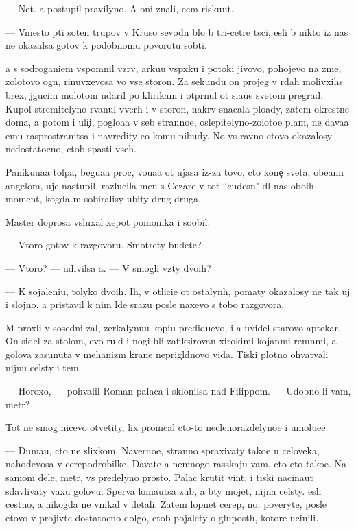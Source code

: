 \documentclass[10pt]{book}
\begin{document}
— Net. {\Y}a postupil pravilyno. A oni znali, cem risku{\y}ut.

— Vmesto p{\ia}ti soten trupov v Kruso sevodn{\ia} b{\yi}lo b{\yi} tri-cet{\yi}re t{\yi}s{\ia}ci, {\y}esli b{\yi} nikto iz nas ne okazalsa gotov k podobnomu povorotu sob{\yi}ti{\y}.

{\Y}a s sodrogani{\y}em vspomnil vzr{\yi}v, {\y}arku{\y}u vsp{\yi}xku i potoki jivovo, pohojevo na zme{\y}, zolotovo ogn{\ia}, rinuvxevosa vo vse storon{\yi}. Za sekundu on projeg v r{\ia}dah molivxihs{\ia} brex, jgucim molotom udaril po klirikam i otpr{\ia}nul ot si{\y}a{\y}u{\x}e{\y} svetom pregrad{\yi}. Kupol stremitelyno rvanul vverh i v storon{\yi}, nakr{\yi}v snacala plo{\x}ady, zatem okrestn{\yi}{\y}e doma, a potom i uli{\c}i, poglo{\x}a{\y}a v seb{\ia} stranno{\y}e, oslepitelyno-zoloto{\y}e plam{\ia}, ne dava{\y}a {\y}emu rasprostranitsa i navredity {\y}e{\x}o komu-nibudy. No vs{\e} ravno etovo okazalosy nedostatocno, ctob{\yi} spasti vseh.

Paniku{\y}u{\x}a{\y}a tolpa, begu{\x}a{\y}a proc, vo{\y}u{\x}a{\y}a ot ujasa iz-za tovo, cto kone{\c} sveta, obe{\x}ann{\yi}{\y} angelom, uje nastupil, razlucila men{\ia} s Cezare v tot ``cudesn{\yi}{\y}" dl{\ia} nas obo{\y}ih moment, kogda m{\yi} sobiralisy ubity drug druga.

Master doprosa v{\yi}sluxal xepot pomo{\x}nika i soob{\x}il:

— Vtoro{\y} gotov k razgovoru. Smotrety budete?

— Vtoro{\y}? — udivilsa {\y}a. — V{\yi} smogli vz{\ia}ty dvo{\y}ih?

— K sojaleni{\y}u, tolyko dvo{\y}ih. Ih, v otlici{\y}e ot ostalyn{\yi}h, po{\y}maty okazalosy ne tak uj i slojno. {\Y}a pristavil k nim l{\iu}de{\y} srazu posle naxevo s tobo{\y} razgovora.

M{\yi} proxli v sosedni{\y} zal, zerkalynu{\y}u kopi{\y}u predidu{\x}evo, i {\y}a uvidel starovo aptekar{\ia}. On sidel za stolom, {\y}evo ruki i nogi b{\yi}li zafiksirovan{\yi} xirokimi kojan{\yi}mi remn{\ia}mi, a golova zasunuta v mehanizm kra{\y}ne neprigl{\ia}dnovo vida. Tiski plotno ohvat{\yi}vali nijn{\iu}{\y}u cel{\iu}sty i tem{\ia}.

— Horoxo, — pohvalil Roman palaca i sklonilsa nad Filippom. — Udobno li vam, metr?

Tot ne smog nicevo otvetity, lix prom{\yi}cal cto-to neclenorazdelyno{\y}e i umol{\ia}{\y}u{\x}e{\y}e.

— Duma{\y}u, cto ne slixkom. Naverno{\y}e, stranno spraxivaty tako{\y}e u celoveka, nahod{\ia}{\x}evosa v cerepodrobilke. Dava{\y}te {\y}a nemnogo rasskaju vam, cto eto tako{\y}e. Na samom dele, metr, vs{\e} predelyno prosto. Palac krutit vint, i tiski nacina{\y}ut sdavlivaty vaxu golovu. Sperva loma{\y}utsa zub{\yi}, a b{\yi}ty mojet, nijn{\ia}{\y}a cel{\iu}sty. {\Y}esli cestno, {\y}a nikogda ne vnikal v detali. Zatem lopnet cerep, no, poveryte, posle etovo v{\yi} projiv{\e}te dostatocno dolgo, ctob{\yi} pojalety o glupost{\ia}h, kotor{\yi}{\y}e ucinili.
\end{document}
